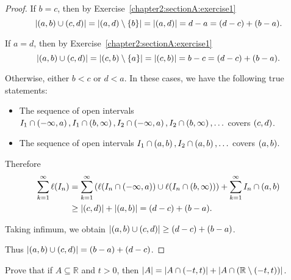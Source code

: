 \begin{proof}
    If $b = c$, then by Exercise~\ref{chapter2:sectionA:exercise1}
    \[
        \left\vert{\left({a, b}\right)\cup\left({c, d}\right)}\right\vert = \left\vert{\left({a, d}\right)\setminus \{b\}}\right\vert = \left\vert{\left({a, d}\right)}\right\vert = d - a = (d - c) + (b - a).
    \]

    If $a = d$, then by Exercise~\ref{chapter2:sectionA:exercise1}
    \[
        \left\vert{\left({a, b}\right)\cup\left({c, d}\right)}\right\vert = \left\vert{\left({c, b}\right)\setminus \{a\}}\right\vert = \left\vert{\left({c, b}\right)}\right\vert = b - c = (d - c) + (b - a).
    \]

    Otherwise, either $b < c$ or $d < a$. In these cases, we have the following true statements:
    \begin{itemize}
        \item The sequence of open intervals $I_{1}\cap\left({-\infty, a}\right), I_{1}\cap\left({b, \infty}\right), I_{2}\cap\left({-\infty, a}\right), I_{2}\cap\left({b, \infty}\right), \ldots$ covers $\left({c, d}\right)$.
        \item The sequence of open intervals $I_{1}\cap\left({a, b}\right), I_{2}\cap\left({a, b}\right), \ldots$ covers $\left({a, b}\right)$.
    \end{itemize}

    Therefore
    \begin{align*}
        \sum^{\infty}_{k=1}\ell(I_{n}) & = \sum^{\infty}_{k=1}\left(\ell(I_{n}\cap\left({-\infty, a}\right)) \cup \ell(I_{n}\cap\left({b, \infty}\right))\right) + \sum^{\infty}_{k=1}I_{n}\cap\left({a, b}\right) \\
                                       & \geq \left\vert{\left({c, d}\right)}\right\vert + \left\vert{\left({a, b}\right)}\right\vert = (d - c) + (b - a).
    \end{align*}

    Taking infimum, we obtain $\left\vert{\left({a, b}\right)\cup\left({c, d}\right)}\right\vert\geq (d - c) + (b - a)$.

    Thus $\left\vert{\left({a, b}\right)\cup \left({c, d}\right)}\right\vert = (b - a) + (d - c)$.
\end{proof}
\newpage

\begin{exercise}\label{chapter2:sectionA:exercise8}
    Prove that if $A\subseteq\mathbb{R}$ and $t > 0$, then $\left\vert{A}\right\vert = \left\vert{A\cap\left({-t, t}\right)}\right\vert + \left\vert{A\cap (\mathbb{R}\setminus \left({-t, t}\right))}\right\vert$.
\end{exercise}

